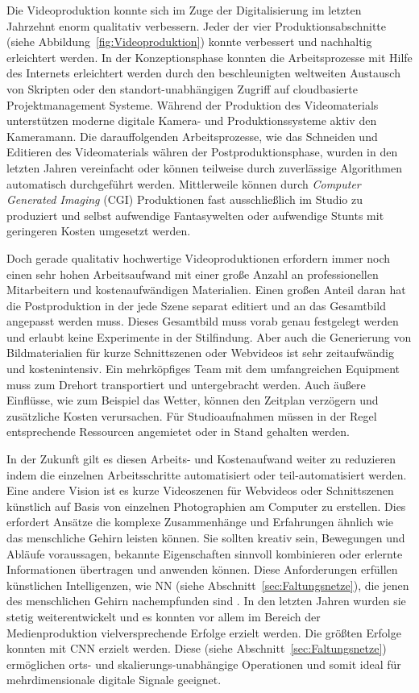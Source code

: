\documentclass[times, 11pt,twocolumn]{article}
\begin{document}
 \label{sec:Einleitung}
Die Videoproduktion konnte sich im Zuge der Digitalisierung im letzten Jahrzehnt enorm qualitativ verbessern. Jeder der vier Produktionsabschnitte (siehe Abbildung~\ref{fig:Videoproduktion}) konnte verbessert und nachhaltig erleichtert werden. In der Konzeptionsphase konnten die Arbeitsprozesse mit Hilfe des Internets erleichtert werden durch den beschleunigten weltweiten Austausch von Skripten oder den standort-unabhängigen Zugriff auf cloudbasierte Projektmanagement Systeme. Während der Produktion des Videomaterials unterstützen moderne digitale Kamera- und Produktionssysteme aktiv den Kameramann. Die darauffolgenden Arbeitsprozesse, wie das Schneiden und Editieren des Videomaterials währen der Postproduktionsphase, wurden in den letzten Jahren vereinfacht oder können teilweise durch zuverlässige Algorithmen automatisch durchgeführt werden. Mittlerweile können durch \textit{Computer Generated Imaging} (CGI) Produktionen fast ausschließlich im Studio zu produziert und selbst aufwendige Fantasywelten oder aufwendige Stunts mit geringeren Kosten umgesetzt werden.

Doch gerade qualitativ hochwertige Videoproduktionen erfordern immer noch einen sehr hohen Arbeitsaufwand mit einer große Anzahl an professionellen Mitarbeitern und kostenaufwändigen Materialien. Einen großen Anteil daran hat die Postproduktion in der jede Szene separat editiert und an das Gesamtbild angepasst werden muss. Dieses Gesamtbild muss vorab genau festgelegt werden und erlaubt keine Experimente in der Stilfindung. Aber auch die Generierung von Bildmaterialien für kurze Schnittszenen oder Webvideos ist sehr zeitaufwändig und kostenintensiv. Ein mehrköpfiges Team mit dem umfangreichen Equipment muss zum Drehort transportiert und untergebracht werden. Auch äußere Einflüsse, wie zum Beispiel das Wetter, können den Zeitplan verzögern und zusätzliche Kosten verursachen. Für Studioaufnahmen müssen in der Regel entsprechende Ressourcen angemietet oder in Stand gehalten werden.

In der Zukunft gilt es diesen Arbeits- und Kostenaufwand weiter zu reduzieren indem die einzelnen Arbeitsschritte automatisiert oder teil-automatisiert werden. Eine andere Vision ist es kurze Videoszenen für Webvideos oder Schnittszenen künstlich auf Basis von einzelnen Photographien am Computer zu erstellen. Dies erfordert Ansätze die komplexe Zusammenhänge und Erfahrungen ähnlich wie das menschliche Gehirn leisten können. Sie sollten kreativ sein, Bewegungen und Abläufe voraussagen, bekannte Eigenschaften sinnvoll kombinieren oder erlernte Informationen übertragen und anwenden können. Diese Anforderungen erfüllen künstlichen Intelligenzen, wie NN (siehe Abschnitt~\ref{sec:Faltungsnetze}), die jenen des menschlichen Gehirn nachempfunden sind \cite{McCaigDG16}. In den letzten Jahren wurden sie stetig weiterentwickelt und es konnten vor allem im Bereich der Medienproduktion vielversprechende Erfolge erzielt werden. Die größten Erfolge konnten mit CNN erzielt werden. Diese (siehe Abschnitt~\ref{sec:Faltungsnetze}) ermöglichen orts- und skalierungs-unabhängige Operationen und somit ideal für mehrdimensionale digitale Signale geeignet.\\
\end{document}
